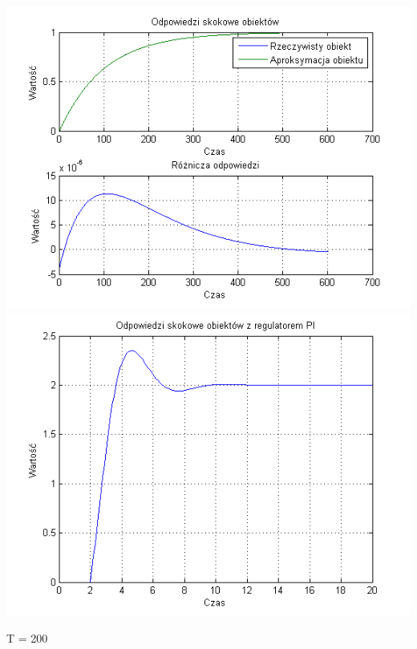 \documentclass[10pt,a4paper]{article}
\begin{document}
\begin{center}
\includegraphics[scale=1]{images/jeden/skrypt_35.png}\\
\includegraphics[scale=1]{images/jeden/skrypt_36.png}\\
\end{center}
\newpage
T = 200
\end{document}

